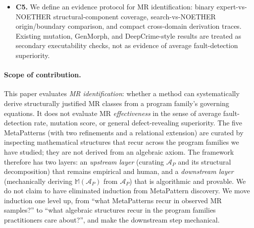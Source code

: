 \documentclass[acmsmall,screen,review]{acmart}
\begin{document}
\begin{itemize}
  \item \textbf{C5.} We define an evidence protocol for MR identification: binary expert-vs-NOETHER structural-component coverage, search-vs-NOETHER origin/boundary comparison, and compact cross-domain derivation traces. Existing mutation, GenMorph, and DeepCrime-style results are treated as secondary executability checks, not as evidence of average fault-detection superiority.
\end{itemize}

\paragraph{Scope of contribution.} This paper evaluates \emph{MR identification}: whether a method can systematically derive structurally justified MR classes from a program family's governing equations. It does not evaluate MR \emph{effectiveness} in the sense of average fault-detection rate, mutation score, or general defect-revealing superiority. The five MetaPatterns (with two refinements and a relational extension) are curated by inspecting mathematical structures that recur across the program families we have studied; they are not derived from an algebraic axiom. The framework therefore has two layers: an \emph{upstream layer} (curating $\mathcal{A}_P$ and its structural decomposition) that remains empirical and human, and a \emph{downstream layer} (mechanically deriving $\mathbb{M}(\mathcal{A}_P)$ from $\mathcal{A}_P$) that is algorithmic and provable. We do not claim to have eliminated induction from MetaPattern discovery. We move induction one level up, from ``what MetaPatterns recur in observed MR samples?'' to ``what algebraic structures recur in the program families practitioners care about?'', and make the downstream step mechanical.
\end{document}

